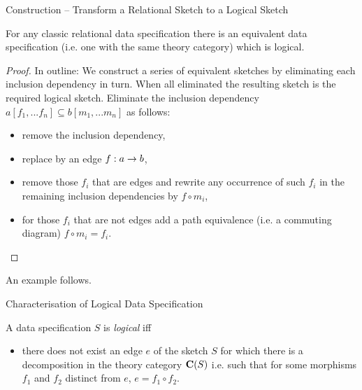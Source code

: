 \begin{frame}{Construction -- Transform a Relational Sketch to a Logical Sketch}
\begin{lemma}
For any classic relational data specification 
there is an equivalent data specification
(i.e. one with the same theory category) which is logical.
\end{lemma}

\begin{proof}
In outline: We construct a series of equivalent sketches by eliminating each 
inclusion dependency in turn. When all eliminated the resulting sketch is the required logical sketch. Eliminate the inclusion dependency 
$a[f_1,...f_n] \subseteq b[m_1,...m_n]$
as follows:
\begin{itemize}
\item remove the inclusion dependency,
\item replace by an edge $f: a \rightarrow b$, 
\item remove those $f_i$ that are edges and 
rewrite any occurrence of such $f_i$ in the remaining inclusion dependencies by $f \circ  m_i$, 
\item for those $f_i$ that are not edges add a path equivalence (i.e. a commuting diagram)
$f \circ m_i = f_i$.
\end{itemize}
\end{proof}
An example follows.
\end{frame}





\begin{frame}{Characterisation of  Logical Data Specification}
\begin{definition}
A data specification $S$ is \textit{logical} iff
\begin{itemize}
	\item there does not exist an edge $e$ of the sketch $S$ for which there is a decomposition in the theory category $\textbf{C}(S)$ i.e. such that 
	for some morphisms $f_1$ and $f_2$  distinct from $e$,
	$e = f_1 \circ f_2$. 
\end{itemize}
\end{definition}
\end{frame}

